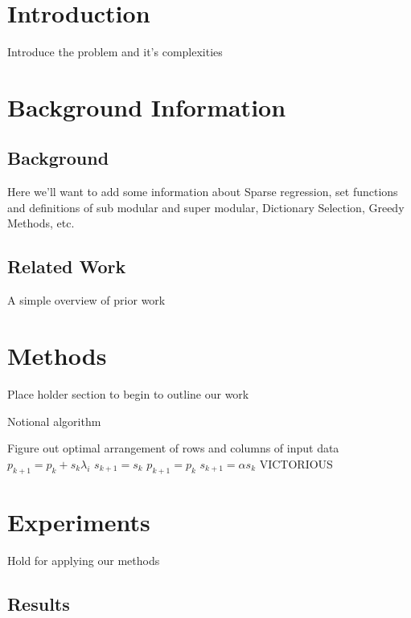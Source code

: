 \documentclass{article}
\begin{document}
\section{Introduction} \label{introduction}
Introduce the problem and it's complexities

\section{Background Information} \label{background}
\subsection{Background}
Here we'll want to add some information about Sparse regression, set functions and definitions of sub modular and super modular, Dictionary Selection, Greedy Methods, etc.

\subsection{Related Work}
A simple overview of prior work


\section{Methods} \label{methods}

Place holder section to begin to outline our work

\begin{algorithm}
  \caption{Notional algorithm}
  \label{alg:compass}
\begin{algorithmic}
  \STATE  Figure out optimal arrangement of rows and columns of input data
  \STATE $p_{k+1} = p_k + s_k\lambda_i$
  \STATE $s_{k+1} = s_k$
  \ELSE
  \STATE $p_{k+1} = p_{k}$
  \STATE $s_{k+1} = \alpha s_k$
  \ENDIF
  \ENDWHILE
  \RETURN VICTORIOUS
\end{algorithmic}
\end{algorithm}

\section{Experiments} \label{experiments}

Hold for applying our methods

\subsection{Results} \label{results}
\end{document}
